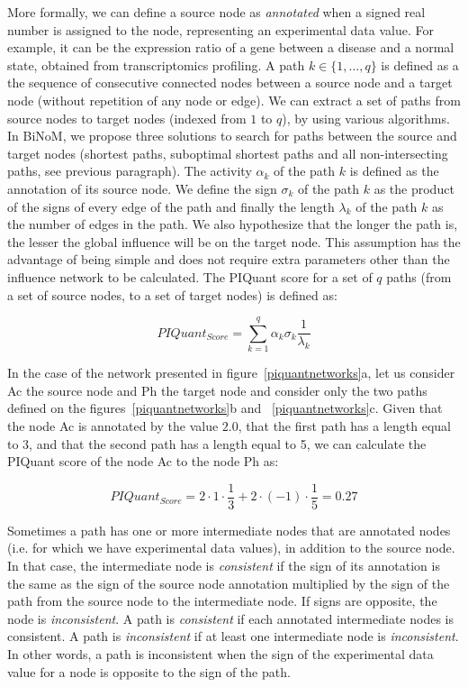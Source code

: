 \documentclass[10pt]{bmc_article}
\newenvironment{bmcformat}{\baselineskip20pt\sloppy\setboolean{publ}{false}}{\baselineskip20pt\sloppy}
\begin{document}
\begin{bmcformat}
More formally, we can define a source node as \textit{annotated} when a signed real
number is assigned to the node, representing an experimental data value. For example, it
can be the expression ratio of a gene between a disease and a normal state,
obtained from transcriptomics profiling. 
 A path $k \in \{1,\ldots , q\}$ is defined
as a the sequence of consecutive connected nodes
between a source node and a target node (without repetition of any node
or edge). We can extract a set of paths from source nodes to target nodes (indexed
from $1$ to $q$), by using various algorithms. In BiNoM, we propose three solutions to search for paths between the
source and target nodes (shortest paths, suboptimal shortest paths and all
non-intersecting paths, see previous paragraph). The activity
$\alpha_k$ of the path $k$ is defined as the annotation
of its source node. We define the sign $\sigma_k$
of the path $k$ as the product of the signs of every edge of the path and finally
the length $\lambda_k$ of the path $k$ as the number of edges in the path. We also
hypothesize that the longer the path is, the lesser the global influence will be
on the target node. This assumption has the advantage of being simple and does
not require extra parameters other than the influence network to be calculated.
The PIQuant score for a set of $q$ paths (from a set of source nodes, to a set
of target nodes) is defined as:

$$
 PIQuant_{Score} = \sum_{k=1}^{q} \alpha_{k} \sigma_{k} \frac{1}{\lambda_{k}}
$$

In the case of the network presented in figure~\ref{piquantnetworks}a, let us
consider Ac the source node and Ph the target node and consider only the two
paths defined on the figures~\ref{piquantnetworks}b and
~\ref{piquantnetworks}c. Given that the
node Ac is annotated by the value $2.0$, that the first path has a length
equal to 3, and that the second path has a length equal to 5, we can calculate the PIQuant score 
of the node Ac to the node Ph as:

$$
 PIQuant_{Score} = 2 \cdot 1 \cdot \frac{1}{3} + 2 \cdot (-1) \cdot \frac{1}{5}
= 0.27
$$


Sometimes a path has one or more intermediate nodes that are annotated nodes 
(i.e. for which we have experimental data values), 
in addition to the source node.
In that case, the intermediate node is \textit{consistent} if the sign of its 
annotation is the same as the sign of the source node annotation multiplied by
the sign of the 
path from the source node to the intermediate node. If signs are opposite, the
node is \textit{inconsistent}. 
A path is \textit{consistent} if each annotated intermediate nodes is
consistent. A path is \textit{inconsistent} if at least one intermediate node is
\textit{inconsistent}.
In other words, a path is inconsistent when the
sign of the experimental data value for a node is opposite to the sign
of the path.


\end{bmcformat}
\end{document}
